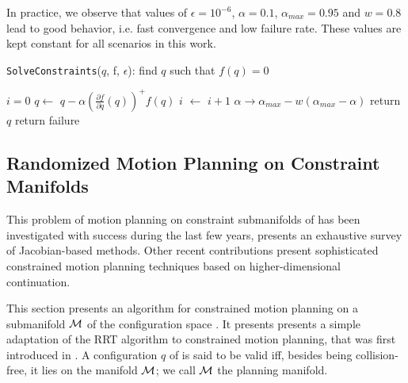 In practice, we observe that values of $\epsilon=10^{-6}$,
$\alpha=0.1$, $\alpha_{max}=0.95$ and $w=0.8$ lead to good behavior,
i.e. fast convergence and low failure rate. These values are kept
constant for all scenarios in this work.

\begin{algorithm}
\caption{\texttt{SolveConstraints}($q$, f, $\epsilon$): find $q$
  such that $f(q) = 0$}
\label{algo:newton}
\begin{algorithmic}
\STATE $i=0$
\STATE $q \leftarrow$ $q - \alpha \left(\frac{\partial f}{\partial q}(q)\right)^{+} f(q)$
\STATE $i$ $\leftarrow$ $i+1$
\STATE $\alpha \rightarrow \alpha_{max} - w(\alpha_{max} - \alpha)$
\ENDWHILE
{}
\STATE return $q$
\ELSE
\STATE return failure
\ENDIF
\end{algorithmic}
\end{algorithm}

\subsection{Randomized Motion Planning on Constraint Manifolds}
\label{subsec:chap2-constraint-motion-planning}

This problem of motion planning on constraint submanifolds of \cspace
has been investigated with success during the last few years,
\cite{Berenson15032011} presents an exhaustive survey of
Jacobian-based methods. Other recent contributions
\cite{porta2012randomized} present sophisticated constrained motion
planning techniques based on higher-dimensional continuation.

This section presents an algorithm for constrained motion planning on
a submanifold $\mathcal{M}$ of the configuration space \cspace. It
presents presents a simple adaptation of the RRT algorithm to
constrained motion planning, that was first introduced in
\cite{dalibard09}. A configuration $q$ of \cspace is said to be valid
iff, besides being collision-free, it lies on the manifold
$\mathcal{M}$; we call $\mathcal{M}$ the planning manifold.

